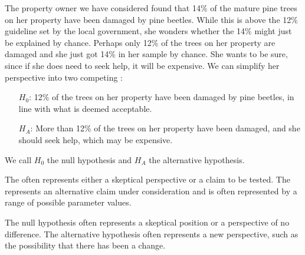 The property owner we have considered found that 14\% of the mature pine trees on her property have been damaged by pine beetles. While this is above the 12\% guideline set by the local government, she wonders whether the 14\% might just be explained by chance. Perhaps only 12\% of the trees on her property are damaged and she just got 14\% in her sample by chance. She wants to be sure, since if she does need to seek help, it will be expensive. We can simplify her perspective into two competing :
\begin{itemize}
\setlength{\itemsep}{0mm}
\item[$H_0$:] 12\% of the trees on her property have been damaged by pine beetles, in line with what is deemed acceptable.
\item[$H_A$:] More than 12\% of the trees on her property have been damaged, and she should seek help, which may be expensive.
\end{itemize}
We call $H_0$ the null hypothesis and $H_A$ the alternative hypothesis.

\begin{termBox}{
{\small The  often represents either a skeptical perspective or a claim to be tested. The  represents an alternative claim under consideration and is often represented by a range of possible parameter values.}}
\end{termBox}

The null hypothesis often represents a skeptical position or a perspective of no difference. The alternative hypothesis often represents a new perspective, such as the possibility that there has been a change.

